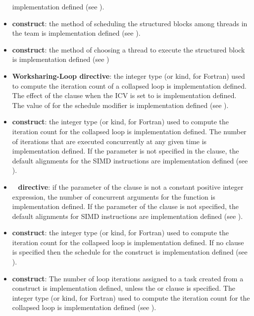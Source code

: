 \begin{itemize}
      implementation defined (see ).
\item {} \textbf{construct}: the method of scheduling the 
      structured blocks among threads in the team is implementation defined 
      (see ).
\item {} \textbf{construct}: the method of choosing a thread to 
      execute the structured block is implementation defined (see 
      )
\item \textbf{Worksharing-Loop directive}: the integer type (or kind, for 
      Fortran) used to compute the iteration count of a collapsed loop is 
      implementation defined. The effect of the  
      clause when the  ICV is set to  is
      implementation defined. The value of  for the 
       schedule modifier is implementation defined (see 
      ).
\item {} \textbf{construct}: the integer type (or kind, for
      Fortran) used to compute the iteration count for the collapsed loop
      is implementation defined. The number of iterations that are executed 
      concurrently at any given time is implementation defined. If the 
       parameter is not specified in the  clause, 
      the default alignments for the SIMD instructions are implementation 
      defined (see ).
\item {}~ \textbf{directive}: if the parameter of the
       clause is not a constant positive integer expression,
      the number of concurrent arguments for the function is
      implementation defined. If the  parameter of the
       clause is not specified, the default alignments for
      SIMD instructions are implementation defined (see
      ).
\item {} \textbf{construct}: the integer type (or kind, for
      Fortran) used to compute the iteration count for the collapsed loop is
      implementation defined.  If no  clause is specified 
      then the schedule for the  construct is implementation 
      defined (see ).
\item {} \textbf{construct}: The number of loop
      iterations assigned to a task created from a 
      construct is implementation defined, unless the  or
       clause is specified. The integer type (or kind,
      for Fortran) used to compute the iteration count for the collapsed
      loop is implementation defined (see ).


\end{itemize}
